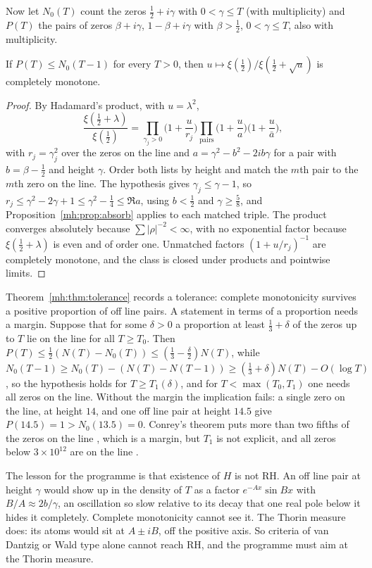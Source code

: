 Now let $N_0(T)$ count the zeros $\tfrac12+i\gamma$ with $0<\gamma\le T$ (with multiplicity) and $P(T)$ the pairs of zeros $\beta+i\gamma$, $1-\beta+i\gamma$ with $\beta>\tfrac12$, $0<\gamma\le T$, also with multiplicity.

\begin{theorem}\label{mh:thm:tolerance}
If $P(T)\le N_0(T-1)$ for every $T>0$, then $u\mapsto\xi(\tfrac12)/\xi(\tfrac12+\sqrt u)$ is completely monotone.
\end{theorem}

\begin{proof}
By Hadamard's product, with $u=\lambda^2$,
\[
\frac{\xi(\frac12+\lambda)}{\xi(\frac12)}=\prod_{\gamma_j>0}\Big(1+\frac{u}{r_j}\Big)\prod_{\text{pairs}}\Big(1+\frac ua\Big)\Big(1+\frac u{\bar a}\Big),
\]
with $r_j=\gamma_j^2$ over the zeros on the line and $a=\gamma^2-b^2-2ib\gamma$ for a pair with $b=\beta-\tfrac12$ and height $\gamma$. Order both lists by height and match the $m$th pair to the $m$th zero on the line. The hypothesis gives $\gamma_j\le\gamma-1$, so $r_j\le\gamma^2-2\gamma+1\le\gamma^2-\tfrac14\le\Re a$, using $b<\frac12$ and $\gamma\ge\frac58$, and Proposition~\ref{mh:prop:absorb} applies to each matched triple. The product converges absolutely because $\sum|\rho|^{-2}<\infty$, with no exponential factor because $\xi(\tfrac12+\lambda)$ is even and of order one. Unmatched factors $(1+u/r_j)^{-1}$ are completely monotone, and the class is closed under products and pointwise limits.
\end{proof}

\begin{remark}\label{mh:rem:tolerance}
Theorem~\ref{mh:thm:tolerance} records a tolerance: complete monotonicity survives a positive proportion of off line pairs. A statement in terms of a proportion needs a margin. Suppose that for some $\delta>0$ a proportion at least $\frac13+\delta$ of the zeros up to $T$ lie on the line for all $T\ge T_0$. Then $P(T)\le\frac12(N(T)-N_0(T))\le(\frac13-\frac\delta2)N(T)$, while $N_0(T-1)\ge N_0(T)-(N(T)-N(T-1))\ge(\frac13+\delta)N(T)-O(\log T)$, so the hypothesis holds for $T\ge T_1(\delta)$, and for $T<\max(T_0,T_1)$ one needs all zeros on the line. Without the margin the implication fails: a single zero on the line, at height $14$, and one off line pair at height $14.5$ give $P(14.5)=1>N_0(13.5)=0$. Conrey's theorem puts more than two fifths of the zeros on the line \cite{Conrey89}, which is a margin, but $T_1$ is not explicit, and all zeros below $3\times10^{12}$ are on the line \cite{PT21}.

The lesson for the programme is that existence of $H$ is not RH. An off line pair at height $\gamma$ would show up in the density of $T$ as a factor $e^{-Ax}\sin Bx$ with $B/A\approx2b/\gamma$, an oscillation so slow relative to its decay that one real pole below it hides it completely. Complete monotonicity cannot see it. The Thorin measure does: its atoms would sit at $A\pm iB$, off the positive axis. So criteria of van Dantzig or Wald type alone cannot reach RH, and the programme must aim at the Thorin measure.
\end{remark}

